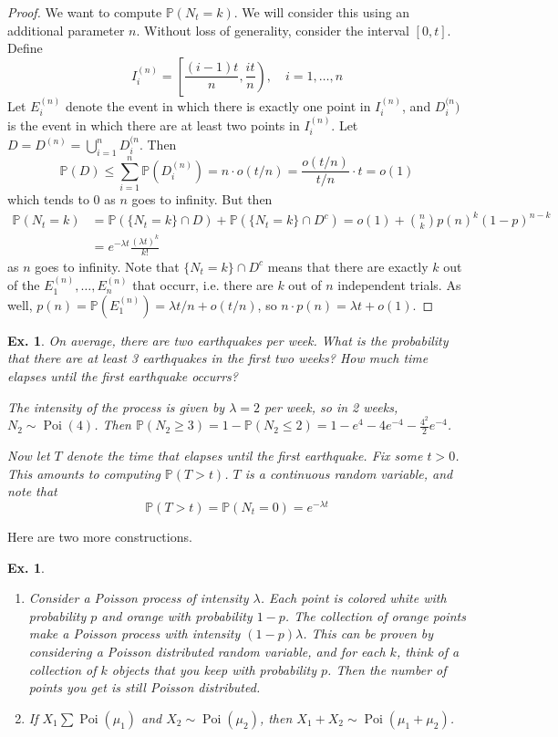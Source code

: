 \documentclass[12pt, a4paper]{book}
\DeclareMathOperator{\Poi}{Poi}
\renewcommand{\Pr}{\mathbb{P}}
\newtheorem{example}[theorem]{Ex.}
\theoremstyle{nonumberplain}
\newtheorem{proof}{Proof}
\begin{document}
\begin{proof}
    We want to compute $\Pr(N_t=k)$.
    We will consider this using an additional parameter $n$.
    Without loss of generality, consider the interval $[0,t]$.
    Define
    \[I_i^{(n)}=\left[\frac{(i-1)t}{n},\frac{it}{n}\right),\quad i=1,\ldots,n\]
    Let $E_i^{(n)}$ denote the event in which there is exactly one point in $I_i^{(n)}$, and $D_i^{(n})$ is the event in which there are at least two points in $I_i^{(n)}$.
    Let $D=D^{(n)}=\bigcup\limits_{i=1}^n D_i^{(n}$.
    Then
    \[\Pr(D)\leq\sum\limits_{i=1}^n\Pr(D_i^{(n)})=n\cdot o(t/n)=\frac{o(t/n)}{t/n}\cdot t=o(1)\]
    which tends to $0$ as $n$ goes to infinity.
    But then
    \begin{align*}
        \Pr(N_t=k)&=\Pr(\{N_t=k\}\cap D)+\Pr(\{N_t=k\}\cap D^c)=o(1)+\binom{n}{k}p(n)^k(1-p)^{n-k}\\
                  &= e^{-\lambda t}\frac{(\lambda t)^k}{k!}
    \end{align*}
    as $n$ goes to infinity.
    Note that $\{N_t=k\}\cap D^c$ means that there are exactly $k$ out of the $E_1^{(n)},\ldots,E_n^{(n)}$ that occurr, i.e. there are $k$ out of $n$ independent trials.
    As well, $p(n)=\Pr(E_1^{(n)})=\lambda t/n+o(t/n)$, so $n\cdot p(n)=\lambda t+o(1)$.
\end{proof}
\begin{example}
    On average, there are two earthquakes per week.
    What is the probability that there are at least 3 earthquakes in the first two weeks?
    How much time elapses until the first earthquake occurrs?

    The intensity of the process is given by $\lambda=2$ per week, so in 2 weeks, $N_2\sim\Poi(4)$.
    Then $\Pr(N_2\geq 3)=1-\Pr(N_2\leq 2)=1-e^4-4e^{-4}-\frac{4^2}{2}e^{-4}$.

    Now let $T$ denote the time that elapses until the first earthquake.
    Fix some $t>0$.
    This amounts to computing $\Pr(T>t)$.
    $T$ is a continuous random variable, and note that
    \[\Pr(T>t)=\Pr(N_t=0)=e^{-\lambda t}\]
\end{example}
Here are two more constructions.
\begin{example}
    \begin{enumerate}
        \item Consider a Poisson process of intensity $\lambda$.
            Each point is colored white with probability $p$ and orange with probability $1-p$.
            The collection of orange points make a Poisson process with intensity $(1-p)\lambda$.
            This can be proven by considering a Poisson distributed random variable, and for each $k$, think of a collection of $k$ objects that you keep with probability $p$.
            Then the number of points you get is still Poisson distributed.
        \item If $X_1\sum\Poi(\mu_1)$ and $X_2\sim\Poi(\mu_2)$, then $X_1+X_2\sim\Poi(\mu_1+\mu_2)$.
    \end{enumerate}
\end{example}
\end{document}
